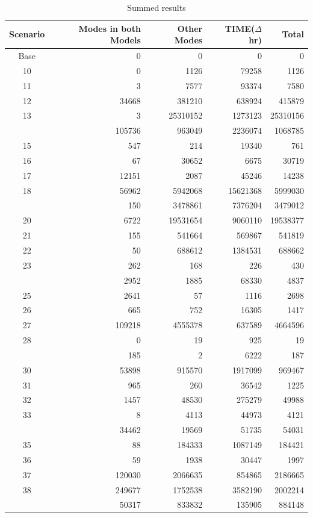 \begin{table}
\begin{table}
\caption{Summed results}
\centering
\begin{tabular}[t]{crrrr}
\toprule
Scenario & Modes in both Models & Other Modes & TIME({$\Delta$} hr) & Total\\
\midrule
Base & 0 & 0 & 0 & 0\\
10 & 0 & 1126 & 79258 & 1126\\
11 & 3 & 7577 & 93374 & 7580\\
12 & 34668 & 381210 & 638924 & 415879\\
13 & 3 & 25310152 & 1273123 & 25310156\\
\addlinespace
14 & 105736 & 963049 & 2236074 & 1068785\\
15 & 547 & 214 & 19340 & 761\\
16 & 67 & 30652 & 6675 & 30719\\
17 & 12151 & 2087 & 45246 & 14238\\
18 & 56962 & 5942068 & 15621368 & 5999030\\
\addlinespace
19 & 150 & 3478861 & 7376204 & 3479012\\
20 & 6722 & 19531654 & 9060110 & 19538377\\
21 & 155 & 541664 & 569867 & 541819\\
22 & 50 & 688612 & 1384531 & 688662\\
23 & 262 & 168 & 226 & 430\\
\addlinespace
24 & 2952 & 1885 & 68330 & 4837\\
25 & 2641 & 57 & 1116 & 2698\\
26 & 665 & 752 & 16305 & 1417\\
27 & 109218 & 4555378 & 637589 & 4664596\\
28 & 0 & 19 & 925 & 19\\
\addlinespace
29 & 185 & 2 & 6222 & 187\\
30 & 53898 & 915570 & 1917099 & 969467\\
31 & 965 & 260 & 36542 & 1225\\
32 & 1457 & 48530 & 275279 & 49988\\
33 & 8 & 4113 & 44973 & 4121\\
\addlinespace
34 & 34462 & 19569 & 51735 & 54031\\
35 & 88 & 184333 & 1087149 & 184421\\
36 & 59 & 1938 & 30447 & 1997\\
37 & 120030 & 2066635 & 854865 & 2186665\\
38 & 249677 & 1752538 & 3582190 & 2002214\\
\addlinespace
39 & 50317 & 833832 & 135905 & 884148\\

\end{tabular}
\end{table}
\end{table}
